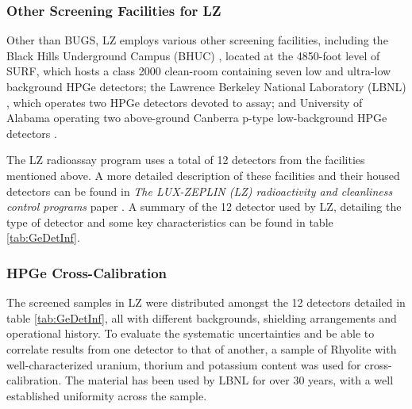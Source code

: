 \subsubsection{Other \gray{} Screening Facilities for LZ}

Other than BUGS, LZ employs various other \gray{} screening facilities, including the Black Hills Underground Campus (BHUC) \cite{Mount:2017iam}, located at the 4850-foot level of SURF, which hosts a class 2000 clean-room containing seven low and ultra-low background HPGe detectors; the Lawrence Berkeley National Laboratory (LBNL) \cite{Smith:2015aoa}, which operates two HPGe detectors devoted to assay; and University of Alabama operating two above-ground Canberra p-type low-background HPGe detectors \cite{Tsang:2019apx}.

The LZ radioassay program uses a total of 12 detectors from the facilities mentioned above. A more detailed description of these facilities and their housed detectors can be found in \textit{The LUX-ZEPLIN (LZ) radioactivity and cleanliness control programs} paper \cite{lz_screening}. A summary of the 12 detector used by LZ, detailing the type of detector and some key characteristics can be found in table \ref{tab:GeDetInf}.




\subsubsection{HPGe Cross-Calibration}



The screened samples in LZ were distributed amongst the 12 detectors detailed in table \ref{tab:GeDetInf}, all with different backgrounds, shielding arrangements and operational history. To evaluate the systematic uncertainties and be able to correlate results from one detector to that of another, a sample of Rhyolite with well-characterized uranium, thorium and potassium content was used for cross-calibration. The material has been used by LBNL for over 30 years, with a well established uniformity across the sample.

